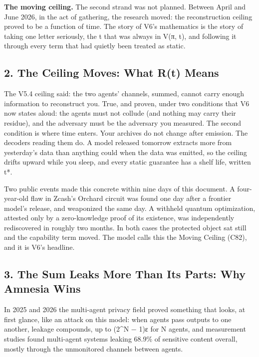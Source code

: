 \documentclass[
]{article}
\begin{document}
\textbf{The moving ceiling.} The second strand was not planned. Between
April and June 2026, in the act of gathering, the research moved: the
reconstruction ceiling proved to be a function of time. The story of
V6's mathematics is the story of taking one letter seriously, the t that
was always in V(π, t), and following it through every term that had
quietly been treated as static.

\subsection{2. The Ceiling Moves: What R(t)
Means}\label{the-ceiling-moves-what-rt-means}

The V5.4 ceiling said: the two agents' channels, summed, cannot carry
enough information to reconstruct you. True, and proven, under two
conditions that V6 now states aloud: the agents must not collude (and
nothing may carry their residue), and the adversary must be the
adversary you measured. The second condition is where time enters. Your
archives do not change after emission. The decoders reading them do. A
model released tomorrow extracts more from yesterday's data than
anything could when the data was emitted, so the ceiling drifts upward
while you sleep, and every static guarantee has a shelf life, written
t*.

Two public events made this concrete within nine days of this document.
A four-year-old flaw in Zcash's Orchard circuit was found one day after
a frontier model's release, and weaponized the same day. A withheld
quantum optimization, attested only by a zero-knowledge proof of its
existence, was independently rediscovered in roughly two months. In both
cases the protected object sat still and the capability term moved. The
model calls this the Moving Ceiling (C82), and it is V6's headline.

\subsection{3. The Sum Leaks More Than Its Parts: Why Amnesia
Wins}\label{the-sum-leaks-more-than-its-parts-why-amnesia-wins}

In 2025 and 2026 the multi-agent privacy field proved something that
looks, at first glance, like an attack on this model: when agents pass
outputs to one another, leakage compounds, up to (2\^{}N − 1)ε for N
agents, and measurement studies found multi-agent systems leaking 68.9\%
of sensitive content overall, mostly through the unmonitored channels
between agents.
\end{document}
